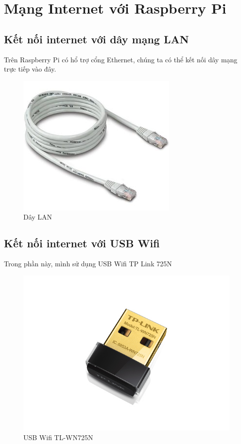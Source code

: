 \chapter{Mạng Internet với Raspberry Pi}
\section{Kết nối internet với dây mạng LAN}
Trên Raspberry Pi có hổ trợ cổng Ethernet, chúng ta có thể kết nối dây mạng trực tiếp vào đây.
\begin{figure}[!h]
\begin{center}
\includegraphics[scale=.4]{network/images/day-lan}
\end{center}
\caption{Dây LAN}
\end{figure}
\section{Kết nối internet với USB Wifi}
Trong phần này, mình sử dụng USB Wifi TP Link 725N
\begin{figure}[!h]
\begin{center}
\includegraphics[scale=.3]{network/images/TL-WN725N}
\end{center}
\caption{USB Wifi TL-WN725N}
\end{figure}
